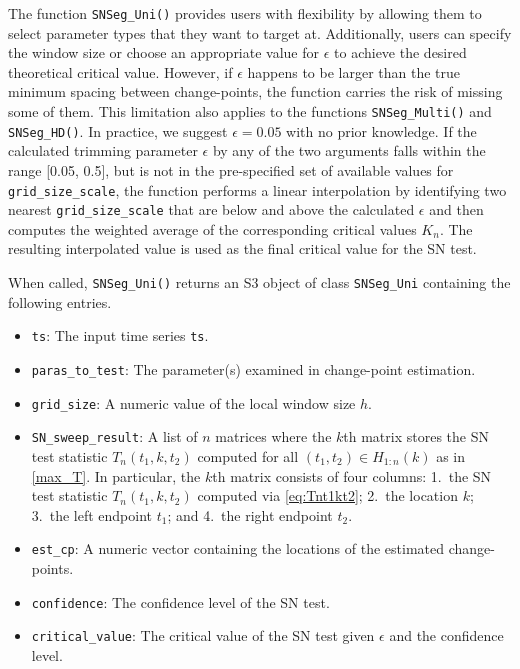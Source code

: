The function \texttt{SNSeg\_Uni()} provides users with flexibility by allowing them to select parameter types that they want to target at. Additionally, users can specify the window size or choose an appropriate value for $\epsilon$ to achieve the desired theoretical critical value. 
{However, if $\epsilon$ happens to be larger than the true minimum spacing between change-points, the function carries the risk of missing some of them. This limitation  also applies to the functions \texttt{SNSeg\_Multi()} and \texttt{SNSeg\_HD()}. In practice, we suggest $\epsilon=0.05$ with no prior knowledge.
} If the calculated trimming parameter $\epsilon$ by any of the two arguments falls within the range [0.05, 0.5], but is not in the pre-specified set of available values for \texttt{grid\_size\_scale}, the function performs a linear interpolation by identifying two nearest \texttt{grid\_size\_scale} that are below and above the calculated $\epsilon$ and then computes the weighted average of the corresponding critical values $K_n$. The resulting interpolated value is used as the final critical value for the SN test.

When called, \texttt{SNSeg\_Uni()} returns {an S3 object of class \texttt{SNSeg\_Uni}} containing the following entries.
\begin{itemize}
        \item \texttt{ts}: The input time series \texttt{ts}.
	\item \texttt{paras\_to\_test}: The parameter(s) examined in change-point estimation. 
	\item \texttt{grid\_size}: A numeric value of the local window size $h$.
	\item \texttt{SN\_sweep\_result}: A list of $n$ matrices where the $k$th matrix stores the SN test statistic $T_n(t_1,k,t_2)$ computed for all $(t_1,t_2)\in H_{1:n}(k)$ as in \eqref{max_T}. In particular, the $k$th matrix consists of four columns: 1.\ the SN test statistic $T_n(t_1,k,t_2)$ computed via \eqref{eq:Tnt1kt2}; 2.\ the location $k$; 3.\ the left endpoint $t_1$; and 4.\ the right endpoint $t_2$. 
	\item \texttt{est\_cp}: A numeric vector containing the locations of the estimated change-points.
	\item \texttt{confidence}: The confidence level of the SN test.
	\item \texttt{critical\_value}: The critical value of the SN test given $\epsilon$ and the confidence level.
\end{itemize}

